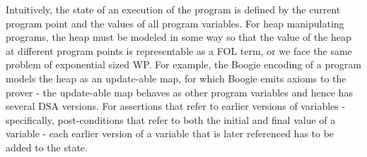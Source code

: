 %

Intuitively, the state of an execution of the program is defined by the current program point and the values of all program variables.
For heap manipulating programs, the heap must be modeled in some way so that the value of the heap at different program points is representable as a FOL term, or we face the same problem of exponential sized WP. 
For example, the Boogie encoding of a program models the heap as an update-able map, for which Boogie emits axioms to the prover - the update-able map behaves as other program variables and hence has several DSA versions.
For assertions that refer to earlier versions of variables - specifically, post-conditions that refer to both the initial and final value of a variable - each earlier version of a variable that is later referenced has to be added to the state.

